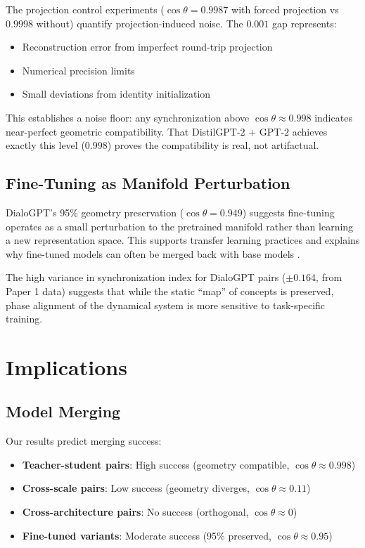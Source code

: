 \documentclass[10pt]{article} %
\theoremstyle{plain}
\theoremstyle{definition}
\theoremstyle{remark}
\begin{document}
The projection control experiments ($\cos \theta = 0.9987$ with forced projection vs $0.9998$ without) quantify projection-induced noise. The $0.001$ gap represents:
\begin{itemize}
    \item Reconstruction error from imperfect round-trip projection
    \item Numerical precision limits
    \item Small deviations from identity initialization
\end{itemize}

This establishes a noise floor: any synchronization above $\cos \theta \approx 0.998$ indicates near-perfect geometric compatibility. That DistilGPT-2 + GPT-2 achieves exactly this level ($0.998$) proves the compatibility is real, not artifactual.

\subsection{Fine-Tuning as Manifold Perturbation}

DialoGPT's 95\% geometry preservation ($\cos \theta = 0.949$) suggests fine-tuning operates as a small perturbation to the pretrained manifold rather than learning a new representation space. This supports transfer learning practices and explains why fine-tuned models can often be merged back with base models \cite{wortsman2022model}.

The high variance in synchronization index for DialoGPT pairs ($\pm 0.164$, from Paper 1 data) suggests that while the static ``map'' of concepts is preserved, phase alignment of the dynamical system is more sensitive to task-specific training.

\section{Implications}

\subsection{Model Merging}

Our results predict merging success:
\begin{itemize}
    \item \textbf{Teacher-student pairs}: High success (geometry compatible, $\cos \theta \approx 0.998$)
    \item \textbf{Cross-scale pairs}: Low success (geometry diverges, $\cos \theta \approx 0.11$)
    \item \textbf{Cross-architecture pairs}: No success (orthogonal, $\cos \theta \approx 0$)
    \item \textbf{Fine-tuned variants}: Moderate success (95\% preserved, $\cos \theta \approx 0.95$)
\end{itemize}
\end{document}
